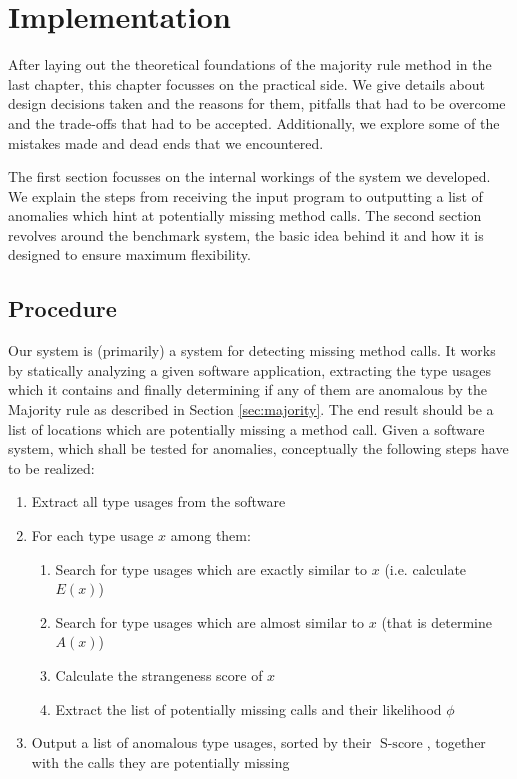 \chapter{Implementation}\label{ch:impl}


After laying out the theoretical foundations of the majority rule method in the last chapter, this chapter focusses on the practical side.
We give details about design decisions taken and the reasons for them, pitfalls that had to be overcome and the trade-offs that had to be accepted.
Additionally, we explore some of the mistakes made and dead ends that we encountered.

The first section focusses on the internal workings of the system we developed.
We explain the steps from receiving the input program to outputting a list of anomalies which hint at potentially missing method calls.
The second section revolves around the benchmark system, the basic idea behind it and how it is designed to ensure maximum flexibility.

\section{Procedure}

Our system is (primarily) a system for detecting missing method calls.
It works by statically analyzing a given software application, extracting the type usages which it contains and finally determining if any of them are anomalous by the Majority rule as described in Section \ref{sec:majority}.
The end result should be a list of locations which are potentially missing a method call.
Given a software system, which shall be tested for anomalies, conceptually the following steps have to be realized:

\begin{enumerate}
    \item Extract all type usages from the software
    \item For each type usage $x$ among them:
    \begin{enumerate}
        \item Search for type usages which are exactly similar to $x$ (i.e. calculate $E(x)$)
        \item Search for type usages which are almost similar to $x$ (that is determine $A(x)$)
        \item Calculate the strangeness score of $x$
        \item Extract the list of potentially missing calls and their likelihood $\phi$
    \end{enumerate}
    \item Output a list of anomalous type usages, sorted by their $\operatorname{S-score}$, together with the calls they are potentially missing
\end{enumerate}


